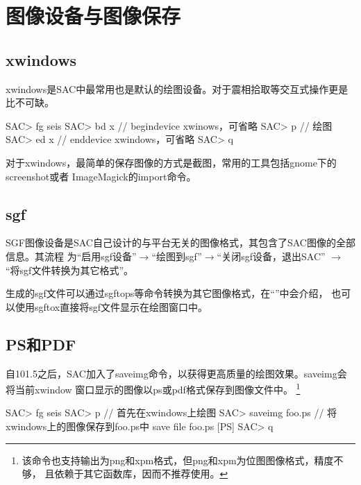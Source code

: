\section{图像设备与图像保存}
\label{sec:save-image}

\subsection{xwindows}
xwindows是SAC中最常用也是默认的绘图设备。对于震相拾取等交互式操作更是比不可缺。
\begin{SACCode}
SAC> fg seis
SAC> bd x       // begindevice xwinows，可省略
SAC> p          // 绘图
SAC> ed x       // enddevice xwindows，可省略
SAC> q
\end{SACCode}

对于xwindows，最简单的保存图像的方式是截图，常用的工具包括gnome下的screenshot或者
ImageMagick的import命令。

\subsection{sgf}
SGF图像设备是SAC自己设计的与平台无关的图像格式，其包含了SAC图像的全部信息。其流程
为``启用sgf设备''$\rightarrow$``绘图到sgf''$\rightarrow$``关闭sgf设备，退出SAC''
$\rightarrow$``将sgf文件转换为其它格式''。

生成的sgf文件可以通过sgftops等命令转换为其它图像格式，在``''中会介绍，
也可以使用sgftox直接将sgf文件显示在绘图窗口中。

\subsection{PS和PDF}
自101.5之后，SAC加入了saveimg命令，以获得更高质量的绘图效果。saveimg会将当前xwindow
窗口显示的图像以ps或pdf格式保存到图像文件中。
    \footnote{该命令也支持输出为png和xpm格式，但png和xpm为位图图像格式，精度不够，
    且依赖于其它函数库，因而不推荐使用。}

\begin{SACCode}
SAC> fg seis
SAC> p                      // 首先在xwindows上绘图
SAC> saveimg foo.ps         // 将xwindows上的图像保存到foo.ps中
save file foo.ps [PS]
SAC> q
\end{SACCode}

